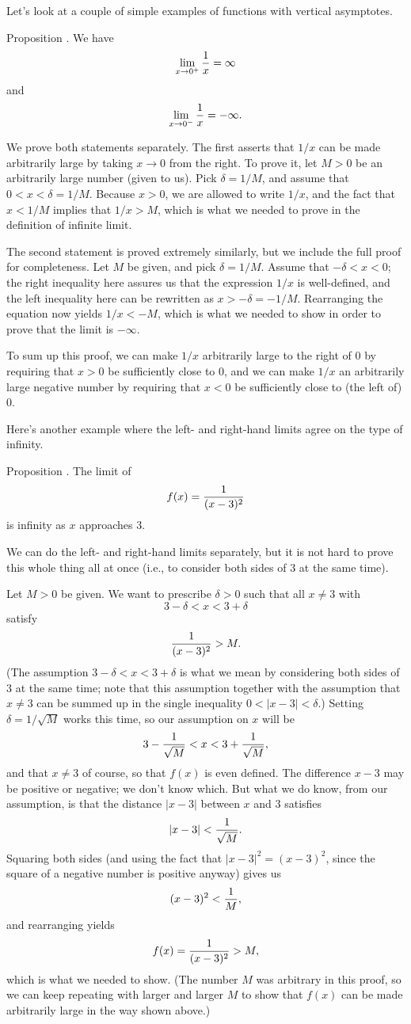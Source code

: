 Let's look at a couple of simple examples of functions with vertical asymptotes.

\edef\propvertasymp{\the\thmcount}
\proclaim Proposition \advthm. We have
$$\lim_{x\to 0^+} {1\over x} = \infty$$
and
$$\lim_{x\to 0^-} {1\over x} = -\infty.$$

\proof We prove both statements separately. The first asserts that $1/x$ can be made
arbitrarily large by taking $x\to 0$ from the right. To prove it, let $M>0$ be an arbitrarily large number
(given to us). Pick $\delta = 1/M$, and assume that $0<x<\delta = 1/M$. Because $x>0$, we are allowed to
write $1/x$, and the fact that $x < 1/M$ implies that $1/x > M$, which is what we needed to prove
in the definition of infinite limit.

The second statement is proved extremely similarly, but we include the full proof for completeness.
Let $M$ be given, and pick $\delta = 1/M$. Assume that $-\delta < x<0$; the right inequality here
assures us that the expression $1/x$ is well-defined, and the left inequality here can be rewritten as
$x > -\delta = -1/M$. Rearranging the equation now yields $1/x < -M$, which is what we needed to show
in order to prove that the limit is $-\infty$.\slug

To sum up this proof, we can make $1/x$ arbitrarily large to the right of $0$ by requiring that $x>0$
be sufficiently close to $0$, and we can make $1/x$ an arbitrarily large negative number by requiring
that $x<0$ be sufficiently close to (the left of) $0$.

Here's another example where the left- and right-hand limits agree on the type of infinity.

\proclaim Proposition \advthm. The limit of
$$f(x) = {1\over (x-3)^2}$$
is infinity as $x$ approaches $3$.

\proof We can do the left- and right-hand limits separately, but it is not hard to prove
this whole thing all at once (i.e., to consider both sides of $3$ at the same time).

Let $M>0$ be given. We want to prescribe $\delta > 0$ such that all $x\ne 3$ with
$$3-\delta < x < 3+\delta$$
satisfy
$${1\over (x-3)^2} > M.$$
(The assumption $3-\delta < x < 3+\delta$ is what we mean by considering both sides of $3$ at the same time;
note that this assumption together with the assumption that $x\ne 3$ can be summed up in the single inequality
$0<|x-3|<\delta$.)
Setting $\delta = 1/\sqrt M$ works this time, so our assumption on $x$ will be
$$3-{1\over \sqrt M} < x < 3+{1\over \sqrt M},$$
and that $x\ne 3$ of course, so that $f(x)$ is even defined.
The difference $x-3$ may be positive or negative; we don't know which. But what we do know, from our assumption,
is that the distance $|x-3|$ between $x$ and $3$ satisfies
$$|x-3| < {1\over \sqrt M}.$$
Squaring both sides (and using the fact that $|x-3|^2 = (x-3)^2$, since the square of a negative number is
positive anyway) gives us
$$(x-3)^2 < {1\over M},$$
and rearranging yields
$$f(x) = {1\over (x-3)^2} > M,$$
which is what we needed to show. (The number $M$ was arbitrary in this proof, so we can keep repeating
with larger and larger $M$ to show that $f(x)$ can be made arbitrarily large in the way shown above.)\slug

